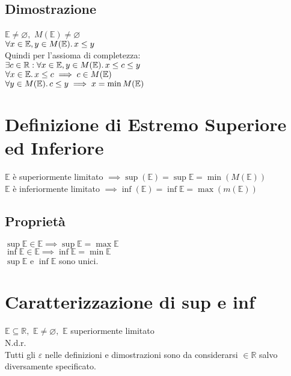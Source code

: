 \documentclass[a4paper, twoside, italian, 11pt]{book}
\newcommand{\R}{\mathbb{R}}
\newcommand{\E}{\mathbb{E}}
\let\emptyset\varnothing
\begin{document}
\subsection{Dimostrazione}

\noindent
$\E \neq \emptyset,$ $M(\E) \neq \emptyset$ \\

\noindent
$\forall x \in \E, y \in M(\E) \ldotp x \leq y$ \\

\noindent
Quindi per l'assioma di completezza: \\

\noindent
$\exists c \in \R : \forall x \in \E, y \in M(\E) \ldotp x \leq c \leq y$ \\

\noindent
$\forall x \in \E \ldotp x \leq c \implies c \in M(\E)$ \\
$\forall y \in M(\E) \ldotp c \leq y \implies x = \min M(\E)$



\section{Definizione di Estremo Superiore ed Inferiore}

\noindent
$\E$ è superiormente limitato $\implies \sup(\E) = \sup \E = \min(M(\E))$ \\

\noindent
$\E$ è inferiormente limitato $\implies \inf(\E) = \inf \E = \max(m(\E))$


\subsection{Proprietà}

\noindent
$\sup \E \in \E \implies \sup \E = \max \E$ \\
$\inf \E \in \E \implies \inf \E = \min \E$ \\
$\sup \E$ e $\inf \E$ sono unici.



\section{Caratterizzazione di sup e inf}

\noindent
$\E \subseteq \R,$ $\E \neq \emptyset,$ $\E$ superiormente limitato \\

\noindent
N.d.r. \\
Tutti gli $\varepsilon$ nelle definizioni e dimostrazioni sono da considerarsi $\in \R$ salvo diversamente specificato.
\end{document}
